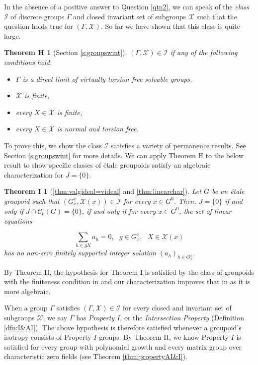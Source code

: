 \documentclass[a4paper, 12pt]{amsart}
\newtheorem*{thmH}{Theorem H}
\newtheorem*{thmI}{Theorem I}
\theoremstyle{definition}
\theoremstyle{remark}
\numberwithin{equation}{section}
\begin{document}
In the absence of a positive answer to Question \ref{qtn2}, we can speak of the \emph{class} $\mathcal{I}$ of discrete groups $\Gamma$ and closed invariant set of subgroups $\mathcal{X}$ such that the question holds true for $(\Gamma,\mathcal{X})$. So far we have shown that this class is quite large.

\begin{thmH}[Section \ref{s:groupswint}]
\label{thmH}
    $(\Gamma,\mathcal{X})\in \mathcal{I}$ if any of the following conditions hold.
    \begin{itemize}
        \item $\Gamma$ is a direct limit of virtually torsion free solvable groups,
        \item $\mathcal{X}$ is finite,
        \item every $X\in\mathcal{X}$ is finite,
        \item every $X\in\mathcal{X}$ is normal and torsion free.
    \end{itemize}
\end{thmH}
To prove this, we show the class $\mathcal{I}$ satisfies a variety of permanence results. See Section \ref{s:groupswint} for more details. We can apply Theorem H to the below result to show specific classes of \'etale groupoids satisfy an algebraic characterization for $J = \{0\}$.

\begin{thmI}[\ref{thm:valgideal=videal} and \ref{thm:linearchar}]
\label{thmI}
    Let $G$ be an \'etale groupoid such that $(G^{x}_{x}, \mathcal{X}(x))\in\mathcal{I}$ for every $x\in G^{0}$. Then, $J = \{0\}$ if and only if $J\cap\mathscr{C}_{c}(G) = \{0\}$, if and only if for every $x\in G^{0}$, the set of linear equations

    $$\sum_{h\in gX}a_{h} = 0,\text{ }g\in G^{x}_{x},\text{ }X\in\mathcal{X}(x)$$ has no non-zero finitely supported integer solution $(a_{h})_{h\in G^{x}_{x}}$.
\end{thmI}

By Theorem H, the hypothesis for Theorem I is satisfied by the class of groupoids with the finiteness condition in \cite[Theorem~4.7]{BGHL25} and our characterization improves that in \cite{BGHL25} as it is more algebraic.

When a group $\Gamma$ satisfies $(\Gamma, \mathcal{X})\in\mathcal{I}$ for every closed and invariant set of subgroups $\mathcal{X}$, we say $\Gamma$ has \emph{Property $I$}, or the \emph{Intersection Property} (Definition \ref{dfn:I&AI}). The above hypothesis is therefore satisfied whenever a groupoid's isotropy consists of Property $I$ groups. By Theorem H, we know Property $I$ is satisfied for every group with polynomial growth and every matrix group over characteristic zero fields (see Theorem \ref{thm:propertyAI&I}).
\end{document}
